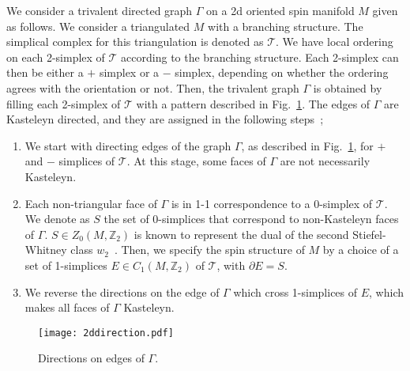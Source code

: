 \documentclass[12pt]{article}
\numberwithin{equation}{section}
\begin{document}
We consider a trivalent directed graph $\Gamma$ on a 2d oriented spin manifold $M$ given as follows. 
We consider a triangulated $M$ with a branching structure. The simplical complex for this triangulation is denoted as $\mathcal{T}$. We have local ordering on each 2-simplex of $\mathcal{T}$ according to the branching structure.
Each 2-simplex can then be either a $+$ simplex or a $-$ simplex, depending on whether the ordering agrees with the orientation or not.
Then, the trivalent graph $\Gamma$ is obtained by filling each 2-simplex of $\mathcal{T}$ with a pattern described in Fig.~\ref{fig:2ddirection}. The edges of $\Gamma$ are Kasteleyn directed, and they are assigned in the following steps~\cite{wanggu1703};
\begin{enumerate}
    \item We start with directing edges of the graph $\Gamma$, as described in Fig.~\ref{fig:2ddirection}, for $+$ and $-$ simplices of $\mathcal{T}$. At this stage, some faces of $\Gamma$ are not necessarily Kasteleyn.
    \item Each non-triangular face of $\Gamma$ is in 1-1 correspondence to a 0-simplex of $\mathcal{T}$. We denote as $S$ the set of 0-simplices that correspond to non-Kasteleyn faces of $\Gamma$. $S\in Z_0(M, \mathbb{Z}_2)$ is known to represent the dual of the second Stiefel-Whitney class $w_2$~\cite{Goldstein, Thorngrenthesis}. Then, we specify the spin structure of $M$ by a choice of a set of 1-simplices $E\in C_1(M,\mathbb{Z}_2)$ of $\mathcal{T}$, with $\partial E=S$.
    \item We reverse the directions on the edge of $\Gamma$ which cross 1-simplices of $E$, which makes all faces of $\Gamma$ Kasteleyn.
\end{enumerate}

\begin{figure}[htb]
\centering
\texttt{[image: 2ddirection.pdf]}
\caption{Directions on edges of $\Gamma$.}
\label{fig:2ddirection}
\end{figure}
\end{document}
